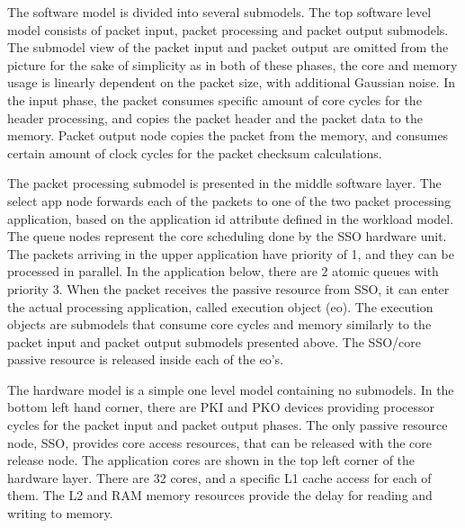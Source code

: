 
The software model is divided into several submodels. The top software level model consists of packet input, packet processing and packet output submodels. The submodel view of the packet input and packet output are omitted from the picture for the sake of simplicity as in both of these phases, the core and memory usage is linearly dependent on the packet size, with additional Gaussian noise. In the input phase, the packet consumes specific amount of core cycles for the header processing, and copies the packet header and the packet data to the memory. Packet output node copies the packet from the memory, and consumes certain amount of clock cycles for the packet checksum calculations.

The packet processing submodel is presented in the middle software layer. The select app node forwards each of the packets to one of the two packet processing application, based on the application id attribute defined in the workload model. The queue nodes represent the core scheduling done by the SSO hardware unit. The packets arriving in the upper application have priority of 1, and they can be processed in parallel. In the application below, there are 2 atomic queues with priority 3. When the packet receives the passive resource from SSO, it can enter the actual processing application, called execution object (eo). The execution objects are submodels that consume core cycles and memory similarly to the packet input and packet output submodels presented above. The SSO/core passive resource is released inside each of the eo's.

The hardware model is a simple one level model containing no submodels. In the bottom left hand corner, there are PKI and PKO devices providing processor cycles for the packet input and packet output phases. The only passive resource node, SSO, provides core access resources, that can be released with the core release node. The application cores are shown in the top left corner of the hardware layer. There are 32 cores, and a specific L1 cache access for each of them. The L2 and RAM memory resources provide the delay for reading and writing to memory.

